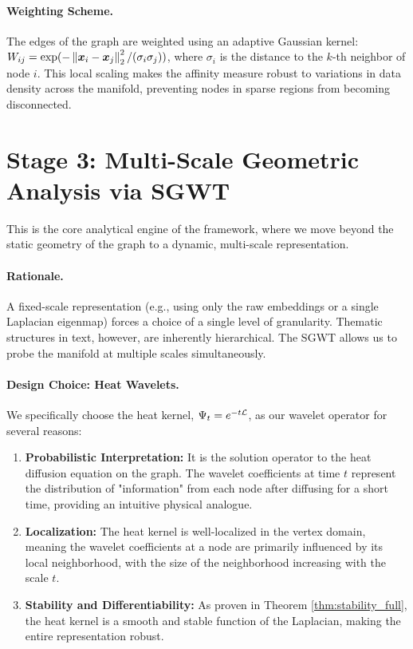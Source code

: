 \paragraph{Weighting Scheme.} The edges of the graph are weighted using an adaptive Gaussian kernel: $W_{ij} = \exp(-\left\lVert\bm{x}_i - \bm{x}_j\right\rVert_2^2 / (\sigma_i \sigma_j))$, where $\sigma_i$ is the distance to the $k$-th neighbor of node $i$. This local scaling makes the affinity measure robust to variations in data density across the manifold, preventing nodes in sparse regions from becoming disconnected.

\section{Stage 3: Multi-Scale Geometric Analysis via SGWT}
This is the core analytical engine of the framework, where we move beyond the static geometry of the graph to a dynamic, multi-scale representation.

\paragraph{Rationale.} A fixed-scale representation (e.g., using only the raw embeddings or a single Laplacian eigenmap) forces a choice of a single level of granularity. Thematic structures in text, however, are inherently hierarchical. The SGWT allows us to probe the manifold at multiple scales simultaneously.

\paragraph{Design Choice: Heat Wavelets.} We specifically choose the heat kernel, $\Psi_t = e^{-t\mathcal{L}}$, as our wavelet operator for several reasons:
\begin{enumerate}
    \item \textbf{Probabilistic Interpretation:} It is the solution operator to the heat diffusion equation on the graph. The wavelet coefficients at time $t$ represent the distribution of "information" from each node after diffusing for a short time, providing an intuitive physical analogue.
    \item \textbf{Localization:} The heat kernel is well-localized in the vertex domain, meaning the wavelet coefficients at a node are primarily influenced by its local neighborhood, with the size of the neighborhood increasing with the scale $t$.
    \item \textbf{Stability and Differentiability:} As proven in Theorem \ref{thm:stability_full}, the heat kernel is a smooth and stable function of the Laplacian, making the entire representation robust.
\end{enumerate}

